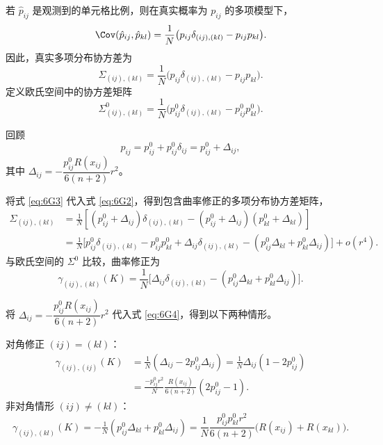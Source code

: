 
若 $\hat p_{ij}$ 是观测到的单元格比例，则在真实概率为 $p_{ij}$ 的多项模型下，
\[
  \Cov(\hat p_{ij},\hat p_{kl})
   =\frac1N\bigl(p_{ij}\delta_{(ij),(kl)}-p_{ij}p_{kl}\bigr).
\]
因此，真实多项分布协方差为
\begin{equation*}
  \Sigma_{(ij),(kl)}=\frac1N\bigl(p_{ij}\delta_{(ij),(kl)}-p_{ij}p_{kl}\bigr).
  \tag{6G2}\label{eq:6G2}
\end{equation*}
定义欧氏空间中的协方差矩阵
\[
  \Sigma^0_{(ij),(kl)}
   =\frac1N\bigl(p_{ij}^0\delta_{(ij),(kl)}-p_{ij}^0p_{kl}^0\bigr).
\]


回顾
\begin{equation*}
  p_{ij}=p_{ij}^0+p_{ij}^0\delta_{ij}=p_{ij}^0+\Delta_{ij},
  \tag{6G3}\label{eq:6G3}
\end{equation*}
其中 $\Delta_{ij}=-\dfrac{p_{ij}^0R(x_{ij})}{6(n+2)}r^2$。

将式 \eqref{eq:6G3} 代入式 \eqref{eq:6G2}，得到包含曲率修正的多项分布协方差矩阵，
\[
  \begin{aligned}
  \Sigma_{(ij),(kl)}
   &=\frac1N\left[(p_{ij}^0+\Delta_{ij})\delta_{(ij),(kl)}
               -(p_{ij}^0+\Delta_{ij})(p_{kl}^0+\Delta_{kl})\right]\\
   &=\frac1N\bigl[p_{ij}^0\delta_{(ij),(kl)}-p_{ij}^0p_{kl}^0
               +\Delta_{ij}\delta_{(ij),(kl)}
               -(p_{ij}^0\Delta_{kl}+p_{kl}^0\Delta_{ij})\bigr]+o(r^4).
  \end{aligned}
\]
与欧氏空间的 $\Sigma^0$ 比较，曲率修正为
\begin{equation*}
  \gamma_{(ij),(kl)}(K)=\frac1N
       \bigl[\Delta_{ij}\delta_{(ij),(kl)}-(p_{ij}^0\Delta_{kl}+p_{kl}^0\Delta_{ij})\bigr].
  \tag{6G4}\label{eq:6G4}
\end{equation*}


将 $\Delta_{ij}=-\dfrac{p_{ij}^0R(x_{ij})}{6(n+2)}r^2$ 代入式 \eqref{eq:6G4}，得到以下两种情形。

对角修正 $(ij)=(kl)$：
\begin{equation*}
  \begin{aligned}
   \gamma_{(ij),(ij)}(K)
      &=\tfrac1N(\Delta_{ij}-2p_{ij}^0\Delta_{ij})
       =\tfrac1N\Delta_{ij}(1-2p_{ij}^0)\\
      &=\frac{-p_{ij}^0r^2}{N}\frac{R(x_{ij})}{6(n+2)}(2p_{ij}^0-1).
  \end{aligned}
  \tag{6G5a}\label{eq:6G5a}
\end{equation*}
非对角情形 $(ij)\ne(kl)$：
\begin{equation*}
  \gamma_{(ij),(kl)}(K)
  =-\tfrac1N(p_{ij}^0\Delta_{kl}+p_{kl}^0\Delta_{ij})
  =\frac1N\frac{p_{ij}^0p_{kl}^0 r^2}{6(n+2)}\bigl(R(x_{ij})+R(x_{kl})\bigr).
  \tag{6G5b}\label{eq:6G5b}
\end{equation*}
